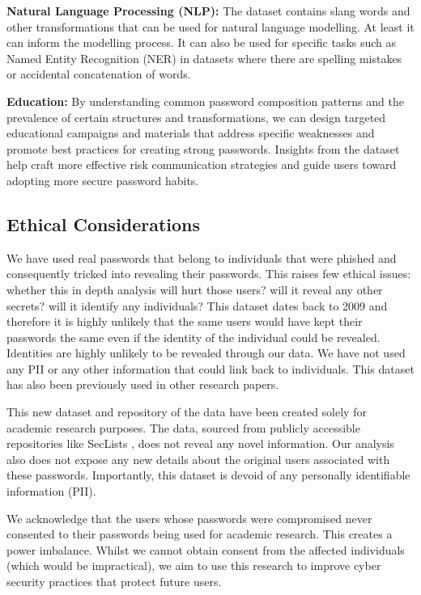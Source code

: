 \textbf{Natural Language Processing (NLP):} The dataset contains slang words and other transformations that can be used for natural language modelling. At least it can inform the modelling process. It can also be used for specific tasks such as Named Entity Recognition (NER) in datasets where there are spelling mistakes or accidental concatenation of words.

\textbf{Education:} By understanding common password composition patterns and the prevalence of certain structures and transformations, we can design targeted educational campaigns and materials that address specific weaknesses and promote best practices for creating strong passwords. Insights from the dataset help craft more effective risk communication strategies and guide users toward adopting more secure password habits.

\subsection{Ethical Considerations}
\label{passwordninja::ethicalconsiderations}

We have used real passwords that belong to individuals that were phished and consequently tricked into revealing their passwords. This raises few ethical issues: whether this in depth analysis will hurt those users? will it reveal any other secrets? will it identify any individuals? This dataset dates back to 2009 and therefore it is highly unlikely that the same users would have kept their passwords the same even if the identity of the individual could be revealed. Identities are highly unlikely to be revealed through our data. We have not used any PII or any other information that could link back to individuals. This dataset has also been previously used in other research papers.

This new dataset and repository of the data have been created solely for academic research purposes. The data, sourced from publicly accessible repositories like SecLists \cite{miessler_danielmiesslerseclists_2024}, does not reveal any novel information. Our analysis also does not expose any new details about the original users associated with these passwords. Importantly, this dataset is devoid of any personally identifiable information (PII).

We acknowledge that the users whose passwords were compromised never consented to their passwords being used for academic research. This creates a power imbalance. Whilst we cannot obtain consent from the affected individuals (which would be impractical), we aim to use this research to improve cyber security practices that protect future users.

